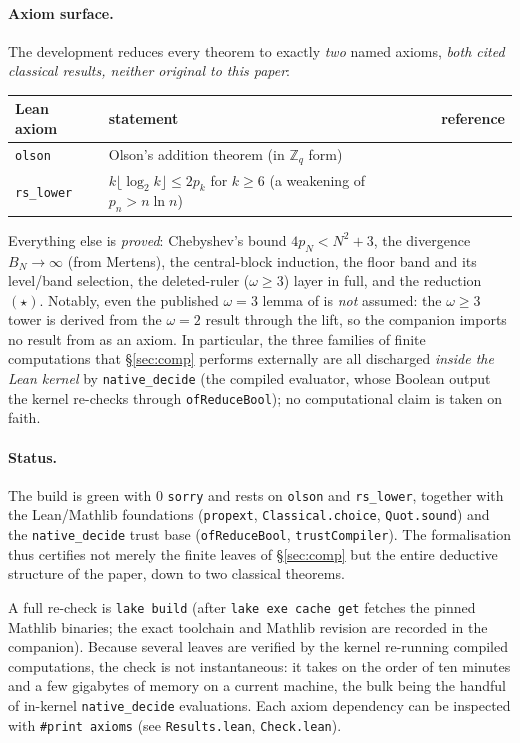\documentclass[11pt]{amsart}
\theoremstyle{plain}
\theoremstyle{definition}
\newcommand{\Z}{\mathbb{Z}}
\begin{document}
\paragraph{Axiom surface.}
The development reduces every theorem to exactly \emph{two} named axioms, \emph{both
cited classical results, neither original to this paper}:
\begin{center}
\begin{tabular}{@{}lll@{}}
\toprule
Lean axiom & statement & reference \\
\midrule
\texttt{olson}     & Olson's addition theorem (in $\Z_q$ form) & \cite{Olson1968} \\
\texttt{rs\_lower} & $k\lfloor\log_2 k\rfloor\le 2p_k$ for $k\ge6$ (a weakening of $p_n>n\ln n$) & \cite{RosserSchoenfeld1962} \\
\bottomrule
\end{tabular}
\end{center}
Everything else is \emph{proved}: Chebyshev's bound $4p_N<N^2+3$, the divergence
$B_N\to\infty$ (from Mertens), the central-block induction, the floor band and its
level/band selection, the deleted-ruler ($\omega\ge3$) layer in full, and the reduction
$(\star)$.  Notably, even the published $\omega=3$ lemma of \cite{BEG2015} is \emph{not}
assumed: the $\omega\ge3$ tower is derived from the $\omega=2$ result through the lift,
so the companion imports no result from \cite{BEG2015} as an axiom.  In particular, the
three families of finite computations that \S\ref{sec:comp}
performs externally are all discharged \emph{inside the Lean kernel} by
\texttt{native\_decide} (the compiled evaluator, whose Boolean output the kernel re-checks
through \texttt{ofReduceBool}); no computational claim is taken on faith.

\paragraph{Status.}
The build is green with $0$ \texttt{sorry} and rests on \texttt{olson} and
\texttt{rs\_lower}, together with the Lean/Mathlib foundations (\texttt{propext},
\texttt{Classical.choice}, \texttt{Quot.sound}) and the \texttt{native\_decide} trust base
(\texttt{ofReduceBool}, \texttt{trustCompiler}).  The formalisation thus certifies not
merely the finite leaves of \S\ref{sec:comp} but the entire deductive structure of the
paper, down to two classical theorems.

A full re-check is \texttt{lake build} (after \texttt{lake exe cache get} fetches the
pinned Mathlib binaries; the exact toolchain and Mathlib revision are recorded in the
companion).  Because several leaves are verified by the kernel re-running compiled
computations, the check is not instantaneous: it takes on the order of ten minutes and a
few gigabytes of memory on a current machine, the bulk being the handful of in-kernel
\texttt{native\_decide} evaluations.  Each axiom dependency can be inspected with
\texttt{\#print axioms} (see \texttt{Results.lean}, \texttt{Check.lean}).
\end{document}
